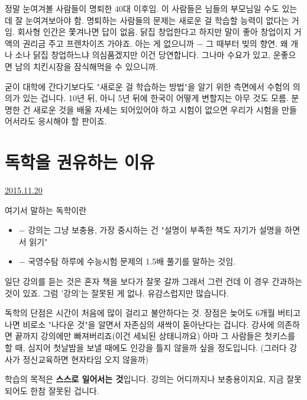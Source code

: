 정말 눈여겨볼 사람들이 명퇴한 40대 이후임. 이 사람들은 님들의 부모님일 수도 있는데 잘 눈여겨보아야 함.
명퇴하는 사람들의 문제는 새로운 걸 학습할 능력이 없다는 거임. 회사형 인간은 쫓겨나면 답이 없음.
닭집 창업한다고 하지만 말이 좋아 창업이지 거액의 권리금 주고 프렌차이즈 가야죠. 아는 게 없으니까 $-$ 그 때부터 빚의 향연.
왜 개나 소나 닭집 창업하느냐 의심품겠지만 이건 당연합니다. 그나마 수요가 있고, 운좋으면 남의 치킨시장을 잠식해먹을 수 있으니까.
\vspace{5mm}

굳이 대학에 간다기보다도 "새로운 걸 학습하는 방법"을 알기 위한 측면에서 수험의 의의가 있는 겁니다.
10년 뒤, 아니 5년 뒤에 한국이 어떻게 변할지는 아무 것도 모름. 분명한 건 새로운 것을 배울 자세는 되어있어야 하고
시험이 없으면 우리가 시험을 만들어서라도 응시해야 할 판이죠.
\vspace{5mm}






\section{독학을 권유하는 이유}
\href{https://www.kockoc.com/Apoc/502091}{2015.11.20}

\vspace{5mm}

여기서 말하는 독학이란
\begin{itemize}
    \item $-$ 강의는 그냥 보충용, 가장 중시하는 건 "설명이 부족한 책도 자기가 설명을 하면서 읽기"
    \item $-$ 국영수탐 하루에 수능시험 문제의 1.5배 풀기를 말하는 것임.
\end{itemize}


\vspace{5mm}

일단 강의를 듣는 것은 혼자 책을 보다가 잘못 갈까 그래서 그런 건데
이 경우 간과하는 것이 있죠. 그럼 '강의'는 잘못된 게 없나. 유감스럽지만 많습니다.
\vspace{5mm}

독학의 단점은 시간이 처음에 많이 걸리고 불안하다는 것.
장점은 늦어도 6개월 버티고 나면 비로소 "나다운 것"을 알면서 자존심의 새싹이 돋아난다는 겁니다.
강사에 의존하면 끝까지 강의에만 빠져버리죠(이건 세뇌된 상태니까요)
아마 그 사람들은 첫키스를 할 때, 심지어 첫날밤을 보낼 때에도 인강을 틀지 않을까 싶을 정도입니다.
(그러다 강사가 정신교육하면 현자타임 오지 않을까)
\vspace{5mm}

학습의 목적은 \textbf{스스로 일어서는 것}입니다. 강의는 어디까지나 보충용이지요, 지금 잘못되어도 한참 잘못된 겁니다.
\vspace{5mm}

